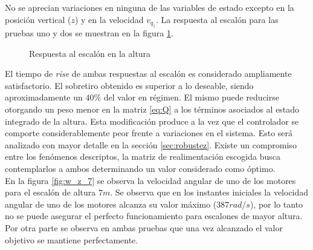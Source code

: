 \documentclass[main]{subfiles}
\begin{document}
No se aprecian variaciones en ninguna de las variables de estado excepto en la posici\'on vertical ($z$) y en la velocidad $v_{q_z}$. La respuesta al escal\'on para las pruebas uno y dos se muestran en la figura \ref{fig:hov_esc_z}. 
\begin{figure}
  \centering
  \caption{Respuesta al escal\'on en la altura}
  \label{fig:hov_esc_z}
\end{figure}

El tiempo de \emph{rise} de ambas respuestas al escal\'on es considerado ampliamente satisfactorio. El sobretiro obtenido es superior a lo deseable, siendo aproximadamente un $40\%$ del valor en r\'egimen. El mismo puede reducirse otorgando un peso menor en la matriz \ref{eq:Q} a los t\'erminos asociados al estado integrado de la altura. Esta modificaci\'on produce a la vez que el controlador se comporte considerablemente peor frente a variaciones en el sistema. Esto ser\'a analizado con mayor detalle en la secci\'on \ref{sec:robustez}. Existe un compromiso entre los fen\'omenos descriptos, la matriz de realimentaci\'on escogida busca contemplarlos a ambos determinando un valor considerado como \'optimo.\\ 

En la figura \ref{fig:w_z_7} se observa la velocidad angular de uno de los motores para el escal\'on de altura $7m$. Se observa que en los instantes iniciales la velocidad angular de uno de los motores alcanza su valor m\'aximo ($387rad/s$), por lo tanto no se puede asegurar el perfecto funcionamiento para escalones de mayor altura. Por otra parte se observa en ambas pruebas que una vez alcanzado el valor objetivo se mantiene perfectamente.\\
\end{document}

